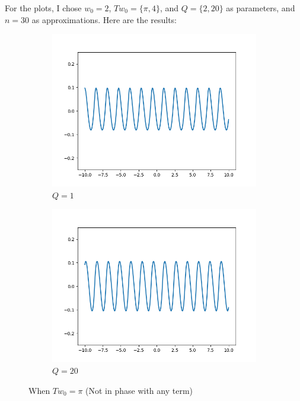 \documentclass{article}
\begin{document}
For the plots, I chose $w_0=2$, $Tw_0 = \{\pi, 4\}$, and $Q=\{2,20\}$ as parameters, and $n=30$ as approximations. Here are the results:
\begin{figure}[h!]
    \centering
     \begin{subfigure}[b]{0.49\textwidth}
         \centering
         \includegraphics[width=\linewidth]{0,0.png}
         \caption{$Q=1$}
     \end{subfigure}
     \begin{subfigure}[b]{0.49\textwidth}
         \centering
         \includegraphics[width=\linewidth]{0,1.png}
         \caption{$Q=20$}
     \end{subfigure}
     \caption{When $Tw_0 = \pi$ (Not in phase with any term)}
\end{figure}
\end{document}
